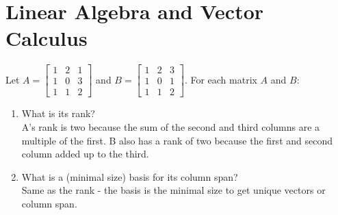 \documentclass{article}
\begin{document}

\newpage
\section*{Linear Algebra and Vector Calculus}
\begin{aprob}
    Let $A = \begin{bmatrix} 1 & 2 & 1 \\ 1 & 0 & 3 \\ 1 & 1 & 2 \end{bmatrix}$ and $B = \begin{bmatrix} 1 & 2 & 3 \\ 1 & 0 & 1 \\ 1 & 1 & 2 \end{bmatrix}$.
    For each matrix $A$ and $B$:
    \begin{enumerate}
    	\item {} What is its rank? \\ A's rank is two because the sum of the second and third columns are a multiple of the first. B also has a rank of two because the first and second column added up to the third.
    	\newpage
        \item {} What is a (minimal size) basis for its column span? \\ Same as the rank - the basis is the minimal size to get unique vectors or column span.
    \end{enumerate}
\end{aprob}
\end{document}
